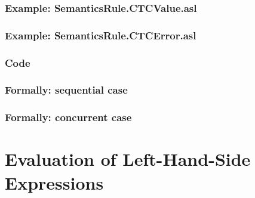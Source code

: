 \documentclass{book}
\begin{document}
  \subsection{Example: SemanticsRule.CTCValue.asl}

  \subsection{Example: SemanticsRule.CTCError.asl}

  \subsection{Code}

\begin{emptyformal}
  \subsection{Formally: sequential case}

  \subsection{Formally: concurrent case}
\end{emptyformal}



\chapter{Evaluation of Left-Hand-Side Expressions \label{chap:eval_lexpr}}
\end{document}
